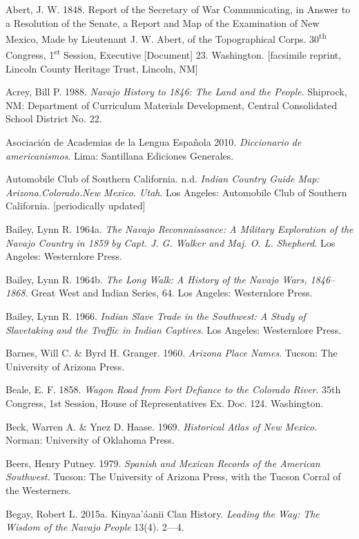 Abert, J. W. 1848. Report of the Secretary of War Communicating, in Answer to a Resolution of the Senate, a Report and Map of the Examination of New Mexico, Made by Lieutenant J. W. Abert, of the Topographical Corps.  30\textsuperscript{th} Congress, 1\textsuperscript{st} Session, Executive [Document] 23. Washington.  [facsimile reprint, Lincoln County Heritage Trust, Lincoln, NM]

Acrey, Bill P.  1988.  \textit{Navajo History to 1846: The Land and the People}.  Shiprock, NM:  Department of Curriculum Materials Development, Central Consolidated School District No. 22.

Asociación de Academias de la Lengua Española 2010.  \textit{Diccionario de americanismos}.  Lima:  Santillana Ediciones Generales.

Automobile Club of Southern California. n.d.  \textit{Indian Country Guide Map: Arizona.Colorado.New Mexico. Utah}.  Los Angeles:  Automobile Club of Southern California.  [periodically updated]

Bailey, Lynn R.  1964a.  \textit{The Navajo Reconnaissance: A Military Exploration of the Navajo Country in 1859 by Capt. J. G. Walker and Maj. O. L. Shepherd}.  Los Angeles:  Westernlore Press.

Bailey, Lynn R. 1964b.  \textit{The Long Walk: A History of the Navajo Wars, 1846--1868}.  Great West and Indian Series, 64.  Los Angeles:  Westernlore Press.

Bailey, Lynn R. 1966.  \textit{Indian Slave Trade in the Southwest: A Study of Slavetaking and the Traffic in Indian Captives}.  Los Angeles:  Westernlore Press.

Barnes, Will C. \& Byrd H. Granger. 1960.  \textit{Arizona Place Names}.  Tucson:  The University of Arizona Press.

Beale, E. F. 1858. \textit{ Wagon Road from Fort Defiance to the Colorado River}.  35th Congress, 1st Session, House of Representatives Ex. Doc. 124.  Washington.

Beck, Warren A. \& Ynez D. Haase. 1969.  \textit{Historical Atlas of New Mexico.}  Norman:  University of Oklahoma Press.

Beers, Henry Putney. 1979.  \textit{Spanish and Mexican Records of the American Southwest.}  Tucson:  The University of Arizona Press, with the Tucson Corral of the Westerners.

Begay, Robert L. 2015a.  Kinyaa’áanii Clan History.  \textit{Leading the Way: The Wisdom of the Navajo People} 13(4). 2---4.

